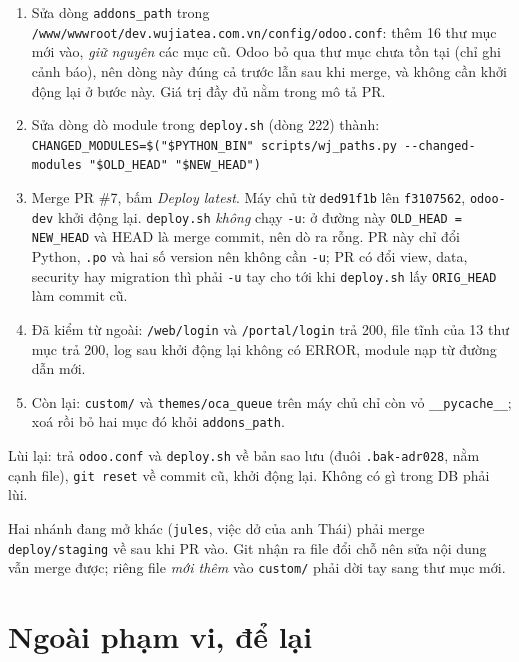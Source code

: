 \begin{enumerate}[nosep]
\item Sửa dòng \texttt{addons\_path} trong
  \texttt{/www/wwwroot/dev.wujiatea.com.vn/config/odoo.conf}: thêm 16 thư mục mới vào, \emph{giữ nguyên} các mục
  cũ. Odoo bỏ qua thư mục chưa tồn tại (chỉ ghi cảnh báo), nên dòng này đúng cả trước lẫn sau khi merge, và không cần
  khởi động lại ở bước này. Giá trị đầy đủ nằm trong mô tả PR.
\item Sửa dòng dò module trong \texttt{deploy.sh} (dòng 222) thành:
  \texttt{CHANGED\_MODULES=\$("\$PYTHON\_BIN" scripts/wj\_paths.py -{}-changed-modules "\$OLD\_HEAD" "\$NEW\_HEAD")}
\item Merge PR \#7, bấm \emph{Deploy latest}. Máy chủ từ \texttt{ded91f1b} lên \texttt{f3107562}, \texttt{odoo-dev} khởi động lại.
  \texttt{deploy.sh} \emph{không} chạy \texttt{-u}: ở đường này \texttt{OLD\_HEAD = NEW\_HEAD} và HEAD là merge commit, nên
  dò ra rỗng. PR này chỉ đổi Python, \texttt{.po} và hai số version nên không cần \texttt{-u}; PR có đổi view, data,
  security hay migration thì phải \texttt{-u} tay cho tới khi \texttt{deploy.sh} lấy \texttt{ORIG\_HEAD} làm commit cũ.
\item Đã kiểm từ ngoài: \texttt{/web/login} và \texttt{/portal/login} trả 200, file tĩnh của 13 thư mục trả 200, log sau
  khởi động lại không có ERROR, module nạp từ đường dẫn mới.
\item Còn lại: \texttt{custom/} và \texttt{themes/oca\_queue} trên máy chủ chỉ còn vỏ \texttt{\_\_pycache\_\_}; xoá rồi bỏ hai
  mục đó khỏi \texttt{addons\_path}.
\end{enumerate}

Lùi lại: trả \texttt{odoo.conf} và \texttt{deploy.sh} về bản sao lưu (đuôi \texttt{.bak-adr028}, nằm cạnh file), \texttt{git reset} về commit cũ, khởi động lại.
Không có gì trong DB phải lùi.

Hai nhánh đang mở khác (\texttt{jules}, việc dở của anh Thái) phải merge \texttt{deploy/staging} về sau khi PR vào.
Git nhận ra file đổi chỗ nên sửa nội dung vẫn merge được; riêng file \emph{mới thêm} vào \texttt{custom/} phải dời
tay sang thư mục mới.

\section{Ngoài phạm vi, để lại}


